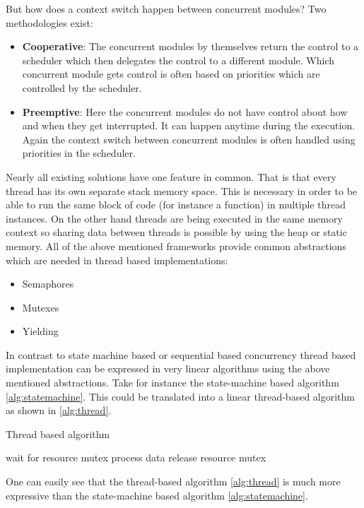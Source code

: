 But how does a context switch happen between concurrent modules? Two methodologies exist:

\begin{itemize}
\item \textbf{Cooperative}: The concurrent modules by themselves return the control to a scheduler which then delegates the control to a different module. Which concurrent module gets control is often based on priorities which are controlled by the scheduler.
\item \textbf{Preemptive}: Here the concurrent modules do not have control about how and when they get interrupted. It can happen anytime during the execution. Again the context switch between concurrent modules is often handled using priorities in the scheduler.
\end{itemize}

Nearly all existing solutions have one feature in common. That is that every thread has its own separate stack memory space. This is necessary in order to be able to run the same block of code (for instance a function) in multiple thread instances. On the other hand threads are being executed in the same memory context so sharing data between threads is possible by using the heap or static memory. All of the above mentioned frameworks provide common abstractions which are needed in thread based implementations:

\begin{itemize}
\item Semaphores
\item Mutexes
\item Yielding
\end{itemize}

In contrast to state machine based or sequential based concurrency thread based implementation can be expressed in very linear algorithms using the above mentioned abstractions. Take for instance the state-machine based algorithm \ref{alg:statemachine}. This could be translated into a linear thread-based algorithm as shown in \ref{alg:thread}.

\begin{algorithm}[H]
\caption{Thread based algorithm}
\label{alg:thread}
\begin{algorithmic}
    \STATE wait for resource mutex
    \STATE process data
    \STATE release resource mutex
\ENDWHILE
\end{algorithmic}
\end{algorithm}

One can easily see that the thread-based algorithm \ref{alg:thread} is much more expressive than the state-machine based algorithm \ref{alg:statemachine}.

